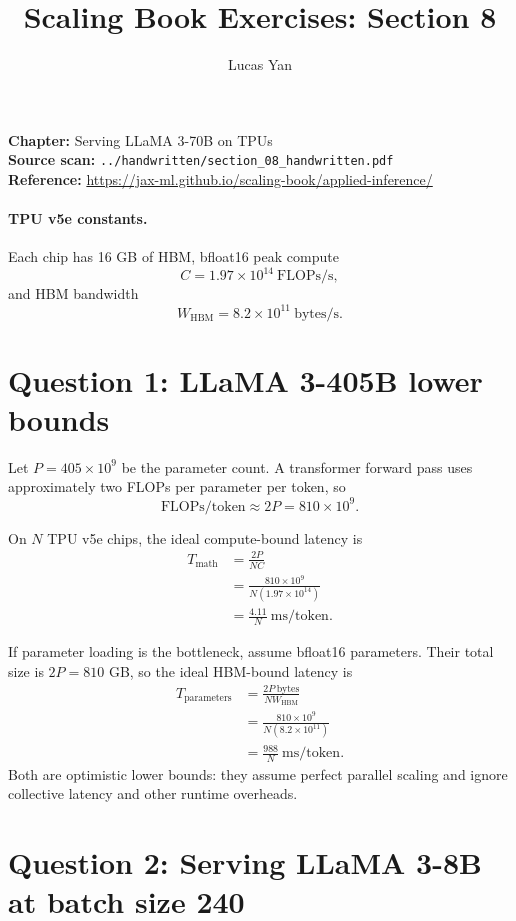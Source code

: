 \documentclass[11pt]{article}
\title{Scaling Book Exercises: Section 8}
\author{Lucas Yan}
\date{}
\begin{document}
\maketitle

\noindent
\textbf{Chapter:} Serving LLaMA 3-70B on TPUs\\
\textbf{Source scan:} \texttt{../handwritten/section\_08\_handwritten.pdf}\\
\textbf{Reference:} \url{https://jax-ml.github.io/scaling-book/applied-inference/}

\paragraph{TPU v5e constants.}
Each chip has 16 GB of HBM, bfloat16 peak compute
\[
C=1.97\times10^{14}\ \text{FLOPs/s},
\]
and HBM bandwidth
\[
W_{\mathrm{HBM}}=8.2\times10^{11}\ \text{bytes/s}.
\]

\section*{Question 1: LLaMA 3-405B lower bounds}

Let \(P=405\times10^9\) be the parameter count. A transformer forward pass
uses approximately two FLOPs per parameter per token, so
\[
\boxed{\text{FLOPs/token}\approx2P=810\times10^9}.
\]

On \(N\) TPU v5e chips, the ideal compute-bound latency is
\begin{align*}
T_{\mathrm{math}}
&=\frac{2P}{NC}\\
&=\frac{810\times10^9}
        {N(1.97\times10^{14})}\\
&=\boxed{\frac{4.11}{N}\ \text{ms/token}}.
\end{align*}

If parameter loading is the bottleneck, assume bfloat16 parameters. Their
total size is \(2P=810\) GB, so the ideal HBM-bound latency is
\begin{align*}
T_{\mathrm{parameters}}
&=\frac{2P\ \text{bytes}}{NW_{\mathrm{HBM}}}\\
&=\frac{810\times10^9}
        {N(8.2\times10^{11})}\\
&=\boxed{\frac{988}{N}\ \text{ms/token}}.
\end{align*}
Both are optimistic lower bounds: they assume perfect parallel scaling and
ignore collective latency and other runtime overheads.

\section*{Question 2: Serving LLaMA 3-8B at batch size 240}
\end{document}
